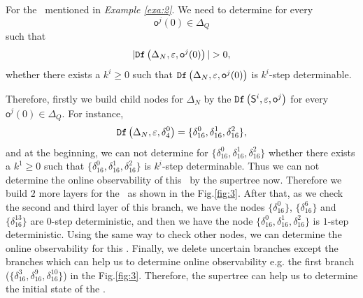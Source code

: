 \begin{example}
For the \BCN\ mentioned in {\em Example \ref{exa:2}}. We need to determine for every \[\mathsf{o}^{j}(0)\in \Delta_Q\] such that \[|\Ded\left(\Delta_N,\varepsilon, \mathsf{o}^{j}(0)\right)|> 0,\] whether there exists a $k^{i}\ge0$ such that ${\tt Df}\left(\Delta_N,\varepsilon,\mathsf{o}^{j}(0)\right)$ is $k^{i}$-step determinable.

Therefore, firstly we build child nodes for $\Delta_N$ by the ${\tt Df}\left(\mathsf{S}^i,\varepsilon, \mathsf{o}^j\right)$ for every $\mathsf{o}^{j}(0)\in \Delta_Q$. For instance, \[{\tt Df}\left(\Delta_N,\varepsilon,\delta_{4}^0\right)=\{\delta_{16}^0,\delta_{16}^1,\delta_{16}^2\},\] and at the beginning, we can not determine for $\{\delta_{16}^0,\delta_{16}^1,\delta_{16}^2\}$ whether there exists a $k^{1}\ge0$ such that $\{\delta_{16}^0,\delta_{16}^1,\delta_{16}^2\}$ is $k^{i}$-step determinable. Thus we can not determine the online observability of this \BCN\ by the supertree now. Therefore we build $2$ more layers for the \BCN\ as shown in the Fig.\ref{fig:3}. After that, as we check the second and third layer of this branch, we have the nodes $\{\delta_{16}^0\}$, $\{\delta_{16}^6\}$ and $\{\delta_{16}^{13}\}$ are $0$-step deterministic, and then we have the node $\{\delta_{16}^0,\delta_{16}^1,\delta_{16}^2\}$ is $1$-step deterministic. Using the same way to check other nodes, we can determine the online observability for this \BCN. Finally, we delete uncertain branches except the branches which can help us to determine online observability e.g. the first branch ($\{\delta_{16}^{3},\delta_{16}^{9},\delta_{16}^{10}\}$) in the Fig.\ref{fig:3}. Therefore, the supertree can help us to determine the initial state of the \BCN.%
\label{exa:11}
\end{example}   

